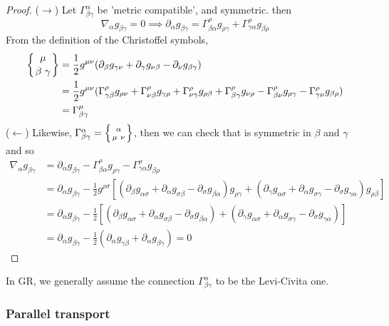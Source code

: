 \documentclass[a4paper]{article}
\theoremstyle{new}
\begin{document}
\begin{proof}
($\rightarrow$) Let $\Gamma_{\beta\gamma}^\alpha$ be 'metric compatible', and symmetric. then
$$\nabla_\alpha g_{\beta\gamma}=0\implies\partial_\alpha g_{\beta\gamma}=\Gamma_{\beta\alpha}^\rho g_{\rho\gamma}+\Gamma_{\gamma\alpha}^\rho g_{\beta\rho}$$
From the definition of the Christoffel symbols,
\begin{align}
\left \{ {\mu \atop
\beta\ \gamma}\right \}&=\frac{1}{2}g^{\mu\nu}(\partial_\beta g_{\gamma\nu}+\partial_\gamma g_{\nu\beta}-\partial_\nu g_{\beta\gamma})\nonumber\\&=\frac{1}{2}g^{\mu\nu}(\Gamma^\rho_{\gamma\beta}g_{\rho\nu}+\Gamma_{\nu\beta}^\rho g_{\gamma\rho}+\Gamma_{\nu\gamma}^\rho g_{\rho\beta}+\Gamma_{\beta\gamma}^\rho g_{\nu\rho}-\Gamma_{\beta\nu}^\rho g_{\rho\gamma}-\Gamma_{\gamma\nu}^\rho g_{\beta\rho})\nonumber\\&=\Gamma_{\beta\gamma}^\mu
\end{align}
($\leftarrow$) Likewise, $\Gamma_{\beta\gamma}^\alpha=\left \{ {\alpha \atop
\mu\ \nu}\right \}$, then we can check that is symmetric in $\beta$ and $\gamma$ and so 
\begin{align}
    \nabla_\alpha g_{\beta\gamma}&=\partial_\alpha g_{\beta\gamma}-\Gamma_{\beta\alpha}^\rho g_{\rho\gamma}-\Gamma_{\gamma\alpha}^\rho g_{\beta\rho}\nonumber\\&=\partial_\alpha g_{\beta\gamma}-\frac{1}{2}g^{\rho\sigma}[(\partial_\beta g_{\alpha\sigma}+\partial_\alpha g_{\sigma\beta}-\partial_\sigma g_{\beta\alpha})g_{\rho\gamma}+(\partial_\gamma g_{\alpha\sigma}+\partial_\alpha g_{\sigma\gamma}-\partial_\sigma g_{\gamma\alpha})g_{\rho\beta}]\nonumber\\&=\partial_\alpha g_{\beta\gamma}-\frac{1}{2}[(\partial_\beta g_{\alpha\sigma}+\partial_\alpha g_{\sigma\beta}-\partial_\sigma g_{\beta\alpha})+(\partial_\gamma g_{\alpha\sigma}+\partial_\alpha g_{\sigma\gamma}-\partial_\sigma g_{\gamma\alpha})]\nonumber\\&=\partial_\alpha g_{\beta\gamma}-\frac{1}{2}(\partial_\alpha g_{\gamma\beta}+\partial_\alpha g_{\beta\gamma})=0\nonumber
\end{align}
\end{proof}
In GR, we generally assume the connection $\Gamma_{\beta\gamma}^\alpha$ to be the Levi-Civita one.

\newpage
\subsubsection{Parallel transport}
\end{document}
